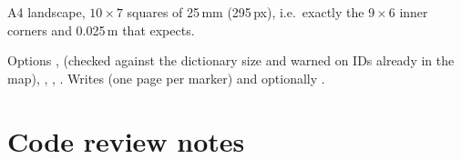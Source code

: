 A4 landscape, $10\times7$ squares of 25\,mm (295\,px), i.e.\ exactly the $9\times6$ inner corners and 0.025\,m that
 expects.

Options ,  (checked against the dictionary size and warned on IDs already in
the map), , , . Writes
 (one page per marker) and optionally .

\section{Code review notes}

